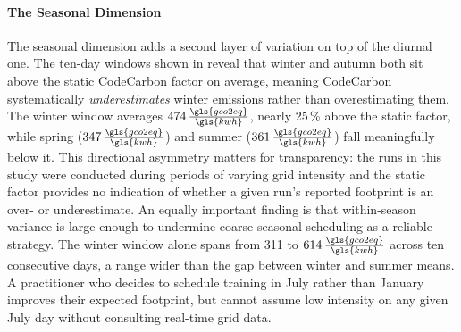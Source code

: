 \paragraph{The Seasonal Dimension}
The seasonal dimension adds a second layer of variation on top of the diurnal one. The ten-day windows shown in  reveal that winter and autumn both sit above the static CodeCarbon factor on average, meaning CodeCarbon systematically \textit{underestimates} winter emissions rather than overestimating them. The winter window averages $474\,\frac{\gls{gco2eq}}{\gls{kwh}}$, nearly 25\,\% above the static factor, while spring ($347\,\frac{\gls{gco2eq}}{\gls{kwh}}$) and summer ($361\,\frac{\gls{gco2eq}}{\gls{kwh}}$) fall meaningfully below it. This directional asymmetry matters for transparency: the runs in this study were conducted during periods of varying grid intensity and the static factor provides no indication of whether a given run's reported footprint is an over- or underestimate. An equally important finding is that within-season variance is large enough to undermine coarse seasonal scheduling as a reliable strategy. The winter window alone spans from 311 to $614\,\frac{\gls{gco2eq}}{\gls{kwh}}$ across ten consecutive days, a range wider than the gap between winter and summer means. A practitioner who decides to schedule training in July rather than January improves their expected footprint, but cannot assume low intensity on any given July day without consulting real-time grid data.

